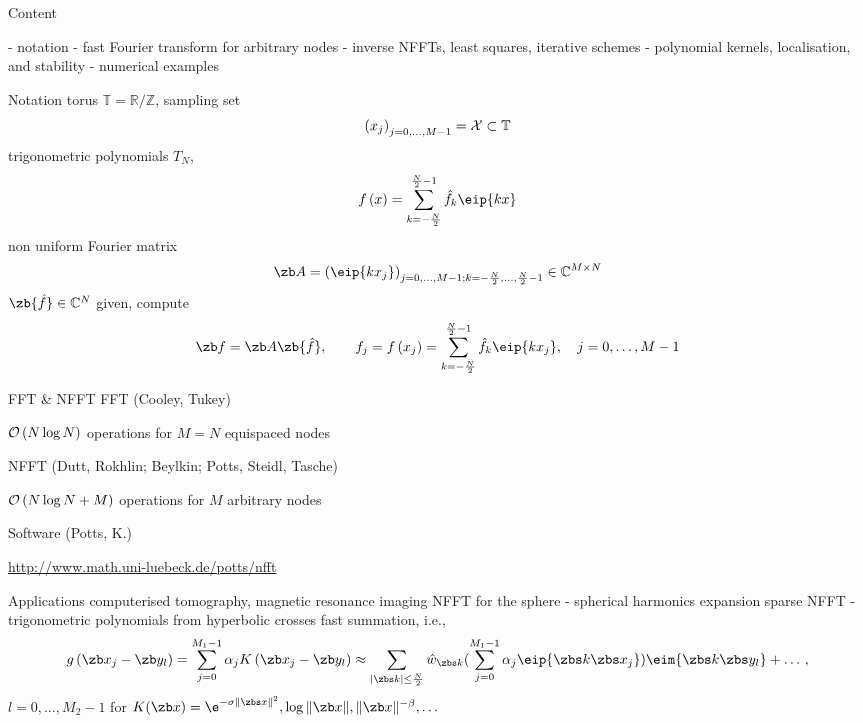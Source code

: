 \newpage

\hypertarget{Inhalt}{}
{\color{blue} \Large Content}

\vfill
- notation
\vfill
- fast Fourier transform for arbitrary nodes
\vfill
- inverse NFFTs, least squares, iterative schemes
\vfill
- polynomial kernels, localisation, and stability
\vfill
- numerical examples
\vfill

\newpage
\vfill
{\color{blue} Notation}
\vfill
torus ${\mathbb T}={\mathbb R} / {\mathbb Z}$, sampling set
\begin{equation*}
\left(x_j\right)_{j=0,\hdots,M-1}={\cal X} \subset {\mathbb T}
\end{equation*}
\vfill
\vfill
trigonometric polynomials $T_N$,
\begin{equation*}
 f\left(x\right)=\sum_{k=-\frac{N}{2}}^{\frac{N}{2}-1} \hat{f}_k \eip{k x}
\end{equation*}
\vfill
non uniform Fourier matrix
\begin{equation*}
 \zb A=\left(\eip{k x_j}\right)_{j=0,\hdots,M-1; k=-\frac{N}{2},\hdots,\frac{N}{2}-1} \in \mathbb{C}^{M\times N}
\end{equation*}
\vfill
$\zb {\hat f} \in \mathbb{C}^N$ given, compute
\begin{equation*}
 \zb f = \zb A \zb {\hat f},\qquad f_j=f\left(x_j\right)=\sum_{k=-\frac{N}{2}}^{\frac{N}{2}-1} \hat{f}_k \eip{k x_j},\quad j=0,\hdots,M-1
\end{equation*}
\vfill

\newpage
\vfill
{\color{blue}FFT \& NFFT}
\vfill
FFT (Cooley, Tukey)
\begin{center}
${\cal O}\left(N \log N\right)$ operations for $M=N$ equispaced nodes
\end{center}
\vfill
NFFT (Dutt, Rokhlin; Beylkin; Potts, Steidl, Tasche)
\begin{center}
${\cal O} \left(N \log N + M\right)$ operations for $M$ arbitrary nodes
\end{center}
\vfill
Software (Potts, K.) %
\begin{center}
 \href{http://www.math.uni-luebeck.de/potts/nfft}{\exco http://www.math.uni-luebeck.de/potts/nfft}
\end{center}
\vfill

\newpage
\hypertarget{NFFT}{}
\vfill
{\color{blue}Applications}
\vfill
computerised tomography, magnetic resonance imaging
\vfill
NFFT for the sphere - spherical harmonics expansion
\vfill
sparse NFFT - trigonometric polynomials from hyperbolic crosses
\vfill
fast summation, i.e.,
\begin{equation*}
 g\left(\zb x_j -\zb y_l\right) = \sum\limits_{j=0}^{M_1-1} \alpha_j K\left(\zb x_j -\zb y_l\right) \approx
 \sum\limits_{|\zbs k|\le \frac{N}{2}} \hat w_{\zbs k}
 (\sum\limits_{j=0}^{M_1-1} \alpha_j \eip{\zbs k \zbs x_j}) \eim{\zbs k \zbs y_l}+\hdots\,,
\end{equation*}
$l=0,\hdots,M_2-1$ for $K(\zb x)=\e^{-\sigma\|\zbs x\|^2}, \log \|\zb x\|, \|\zb x\|^{-\beta},\hdots$
\vfill


